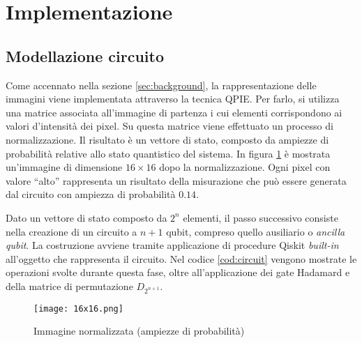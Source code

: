 \section{Implementazione}\label{sec:implementazione}

\subsection{Modellazione circuito}
Come accennato nella sezione \ref{sec:background}, la rappresentazione 
delle immagini viene implementata attraverso la tecnica QPIE. 
Per farlo, si utilizza una matrice associata all'immagine di partenza
i cui elementi corrispondono ai valori d'intensità dei pixel.
Su questa matrice viene effettuato un processo di normalizzazione.
Il risultato è un vettore di stato, composto da ampiezze di
probabilità relative allo stato quantistico del sistema. 
In figura \ref{fig:16x16intensity_img} è mostrata un'immagine di 
dimensione $16 \times 16$ dopo la normalizzazione. Ogni pixel 
con valore ``alto'' rappresenta un risultato della misurazione 
che può essere generata dal circuito con ampiezza di probabilità $0.14$.

Dato un vettore di stato composto da $2^n$ elementi, 
il passo successivo consiste nella creazione di un circuito a $n+1$ qubit, 
compreso quello ausiliario o \textit{ancilla qubit}.
La costruzione avviene tramite applicazione di procedure Qiskit \textit{built-in} 
all'oggetto che rappresenta il circuito.
Nel codice \ref{cod:circuit} vengono mostrate le operazioni svolte durante
questa fase, oltre all'applicazione dei gate Hadamard e della matrice 
di permutazione $D_{2^{n+1}}$.

\begin{figure}
    \centering
    \texttt{[image: 16x16.png]}
    \caption{Immagine normalizzata (ampiezze di probabilità)}
    \label{fig:16x16intensity_img}
\end{figure}

